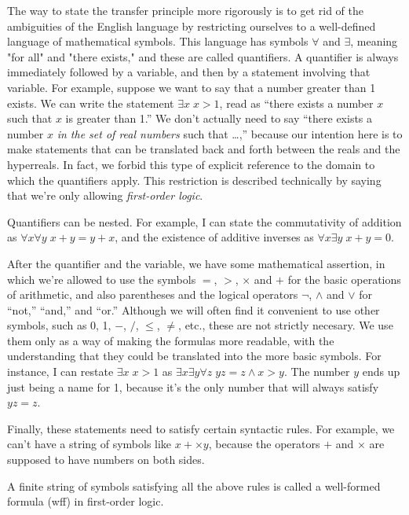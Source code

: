 The way to state the transfer principle more rigorously is to get rid of the ambiguities of
the English language by restricting ourselves to a well-defined language of mathematical symbols.
This language has symbols $\forall$ and $\exists$, meaning "for all" and "there exists," and these
are called quantifiers. A quantifier is always immediately followed by a variable, and
then by a statement involving that variable.
For example, suppose we want to say that a number greater than 1 exists. We can write the statement $\exists x \; x>1$,
read as ``there exists a number $x$ such that $x$ is greater than 1.'' We don't actually need to say
``there exists a number $x$ \emph{in the set of real numbers} such that \ldots,'' because our intention here is to make statements
that can be translated back and forth between the reals and the hyperreals. In fact, we forbid this
type of explicit reference to the domain to which the quantifiers apply. This restriction is described
technically by saying that we're only allowing \emph{first-order logic}.

Quantifiers can be nested. For example, I can state the commutativity of addition as
$\forall x \forall y \; x+y=y+x$, and the existence of additive inverses as $\forall x \exists y \; x+y=0$.

After the quantifier and the variable, we have some mathematical assertion, in which we're allowed to use the symbols
$=$, $>$, $\times$ and $+$ for the basic operations of arithmetic, and also parentheses and the logical
operators $\neg$, $\wedge$ and $\vee$ for ``not,'' ``and,'' and ``or.''
Although we will often find it convenient to use other symbols, such as 0, 1,
$-$, $/$, $\le$, $\ne$, etc., these are not strictly necesary. We use them only as a way of making the formulas more
readable, with the understanding that they could be translated into the more basic symbols.
For instance, I can restate $\exists x \; x>1$ as $\exists x \exists y \forall z \; yz=z \wedge x>y$.
The number $y$ ends up just being a name for 1, because it's the only number that will always satisfy
$yz=z$.

Finally, these statements need to satisfy certain syntactic rules. For example, we can't have a string of
symbols like $x+\times y$, because the operators $+$ and $\times$ are supposed to have numbers on both sides.

A finite string of symbols satisfying all the above rules is called a well-formed formula (wff)
in first-order logic.

